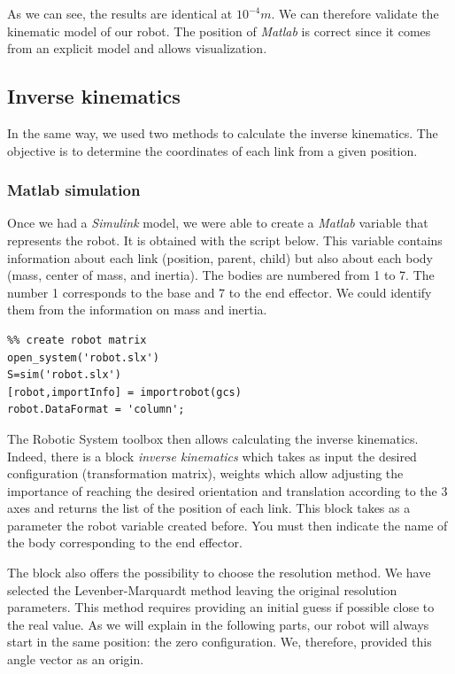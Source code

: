 \bigbreak
As we can see, the results are identical at $10^{-4}m$. We can therefore validate the kinematic model of our robot. The position of \textit{Matlab} is correct since it comes from an explicit model and allows visualization.

\subsection{Inverse kinematics}

In the same way, we used two methods to calculate the inverse kinematics. The objective is to determine the coordinates of each link from a given position.

\subsubsection{Matlab simulation}

Once we had a \textit{Simulink} model, we were able to create a \textit{Matlab} variable that represents the robot. It is obtained with the script below.  This variable contains information about each link (position, parent, child) but also about each body (mass, center of mass, and inertia). The bodies are numbered from 1 to 7. The number 1 corresponds to the base and 7 to the end effector. We could identify them from the information on mass and inertia.

\begin{verbatim}
%% create robot matrix
open_system('robot.slx')
S=sim('robot.slx')
[robot,importInfo] = importrobot(gcs)
robot.DataFormat = 'column';
\end{verbatim}

\bigbreak
The Robotic System toolbox then allows calculating the inverse kinematics. Indeed, there is a block \textit{inverse kinematics} which takes as input the desired configuration (transformation matrix), weights which allow adjusting the importance of reaching the desired orientation and translation according to the 3 axes and returns the list of the position of each link. This block takes as a parameter the robot variable created before. You must then indicate the name of the body corresponding to the end effector.

\bigbreak
The block also offers the possibility to choose the resolution method. We have selected the Levenber-Marquardt method leaving the original resolution parameters. This method requires providing an initial guess if possible close to the real value. As we will explain in the following parts, our robot will always start in the same position: the zero configuration. We, therefore, provided this angle vector as an origin.

